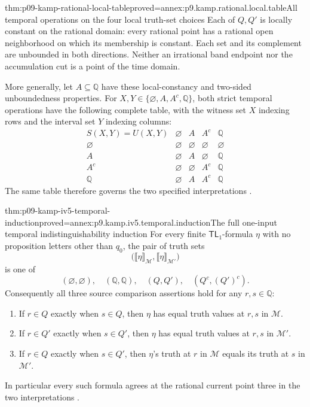 \begin{hblemma}{thm:p09-kamp-rational-local-table}{proved=annex:p9.kamp.rational.local.table}{All temporal operations on the four local truth-set choices}
Each of \(Q,Q'\) is locally constant on the rational domain:
every rational point has a rational open neighborhood on which its
membership is constant. Each set and its complement are unbounded
in both directions. Neither an irrational band endpoint nor the
accumulation cut is a point of the time domain.

More generally, let \(A\subseteq\mathbb Q\) have these
local-constancy and two-sided unboundedness properties. For
\(X,Y\in\{\varnothing,A,A^c,\mathbb Q\}\), both
strict temporal operations have the following complete table,
with the witness set \(X\) indexing rows and the interval
set \(Y\) indexing columns:
\[
\begin{array}{c|cccc}
 S(X,Y)=U(X,Y)&\varnothing&A&A^c&\mathbb Q\\ \hline
 \varnothing&\varnothing&\varnothing&\varnothing&\varnothing\\
 A&\varnothing&A&\varnothing&\mathbb Q\\
 A^c&\varnothing&\varnothing&A^c&\mathbb Q\\
 \mathbb Q&\varnothing&A&A^c&\mathbb Q
\end{array}
\]
The same table therefore governs the two specified interpretations
\cite[ch.~IV, pp.~110--112]{Kamp1968}.
\end{hblemma}

\begin{hblemma}{thm:p09-kamp-iv5-temporal-induction}{proved=annex:p9.kamp.iv5.temporal.induction}{The full one-input temporal indistinguishability induction}
For every finite \(\mathsf{TL}_1\)-formula \(\eta\) with
no proposition letters other than \(q_0\), the pair of truth sets
\[
  \bigl(\llbracket\eta\rrbracket_{\mathcal M},
        \llbracket\eta\rrbracket_{\mathcal M'}\bigr)
\]
is one of
\[
 (\varnothing,\varnothing),\quad
 (\mathbb Q,\mathbb Q),\quad (Q,Q'),\quad (Q^c,(Q')^c).
\]
Consequently all three source comparison assertions hold for any
\(r,s\in\mathbb Q\):

\begin{enumerate}
\item If \(r\in Q\) exactly when \(s\in Q\), then
      \(\eta\) has equal truth values at \(r,s\) in
      \(\mathcal M\).
\item If \(r\in Q'\) exactly when \(s\in Q'\), then
      \(\eta\) has equal truth values at \(r,s\) in
      \(\mathcal M'\).
\item If \(r\in Q\) exactly when \(s\in Q'\), then
      \(\eta\)'s truth at \(r\) in \(\mathcal M\)
      equals its truth at \(s\) in \(\mathcal M'\).
\end{enumerate}

In particular every such formula agrees at the rational current point
three in the two interpretations
\cite[ch.~IV, thm.~5 proof, pp.~110--112]{Kamp1968}.
\end{hblemma}

